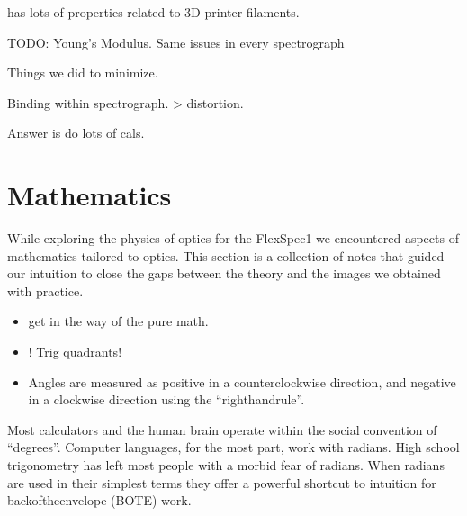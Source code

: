 \documentclass[letterpaper,10pt,english,openany,oneside]{sphinxmanual}
\begin{document}
\sphinxAtStartPar
{} has lots of properties related to 3D printer filaments.

\sphinxAtStartPar
TODO: Young’s Modulus.
Same issues in every spectrograph

\sphinxAtStartPar
Things we did to minimize.

\sphinxAtStartPar
Binding within spectrograph. \sphinxhyphen{}\textgreater{} distortion.

\sphinxAtStartPar
Answer is do lots of cals.

\sphinxAtStartPar
{}


\chapter{Mathematics}
\label{\detokenize{mathematics:mathematics}}\label{\detokenize{mathematics::doc}}
\sphinxAtStartPar
While exploring the physics of optics for the FlexSpec1 we encountered
aspects of mathematics tailored to optics. This section is a collection
of notes that guided our intuition to close the gaps between the theory
and the images we obtained with practice.
\begin{itemize}
\item {} 
\sphinxAtStartPar
{} get in the way of the pure math.

\item {} 
\sphinxAtStartPar
{}! Trig  quadrants!

\item {} 
\sphinxAtStartPar
Angles are measured as positive in a counter\sphinxhyphen{}clockwise direction, and negative in a clockwise direction using the “right\sphinxhyphen{}hand\sphinxhyphen{}rule”.

\end{itemize}

\sphinxAtStartPar
Most calculators and the human brain operate within the social
convention of “degrees”. Computer languages, for the most part, work
with radians. High school trigonometry has left most people with a
morbid fear of radians. When radians are used in their simplest terms
they offer a powerful shortcut to intuition for
back\sphinxhyphen{}of\sphinxhyphen{}the\sphinxhyphen{}envelope (BOTE) work.
\end{document}
